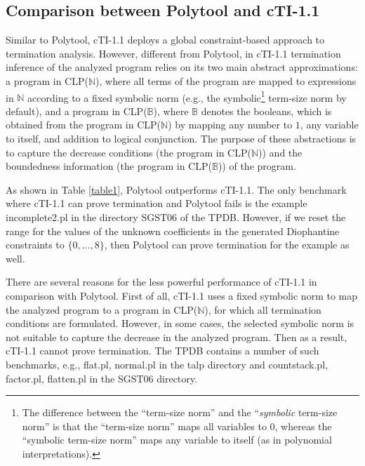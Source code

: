\documentclass[envcountsame]{tlp}
\newcounter{ex:der-lastsymconsctr}
\begin{document}
\subsection{Comparison between \textsf{Polytool} and \textsf{cTI-1.1}}
\label{polytool-cti}

Similar to \textsf{Polytool}, \textsf{cTI-1.1} deploys a global constraint-based approach to termination
analysis. However, different from \textsf{Polytool}, in \textsf{cTI-1.1} termination
inference of the analyzed program relies on its two main abstract
approximations: a program in \textsf{CLP($\mathbb{N}$)}, where all terms of
the program are mapped to expressions in $\mathbb{N}$ according to a fixed
symbolic norm (e.g., the symbolic\footnote{The difference between the
``term-size norm'' and the ``\emph{symbolic} term-size norm'' is that the
``term-size norm'' maps all variables to $0$, whereas the
``symbolic term-size norm'' maps any variable to itself (as in polynomial
interpretations).}
term-size norm by default), and a program in
\textsf{CLP($\mathbb{B}$)}, where $\mathbb{B}$ denotes the booleans, which is obtained from the
program in \textsf{CLP($\mathbb{N}$)} by mapping any number to
	$1$, any variable to itself, and addition to logical conjunction. The
		purpose of these abstractions is to capture the decrease conditions
		(the program in \textsf{CLP($\mathbb{N}$)}) and the boundedness information
			(the program in \textsf{CLP($\mathbb{B}$)}) of the program.

As shown in Table \ref{table1}, \textsf{Polytool} outperforms
\textsf{cTI-1.1}. The only benchmark where \textsf{cTI-1.1} can prove
termination and \textsf{Polytool} fails is the example
\textsf{incomplete2.pl} in the directory \textsf{SGST06} of the TPDB. 
However, if we reset the range for the values of the unknown coefficients in the
generated Diophantine constraints to $\{0,\ldots,8\}$, then \textsf{Polytool}
can prove termination for the example as well.

There are several reasons for the less powerful performance of \textsf{cTI-1.1}
in comparison with \textsf{Polytool}.  
First of all, \textsf{cTI-1.1} uses a fixed symbolic norm 
to map the analyzed program to a program in
\textsf{CLP($\mathbb{N}$)}, for which all termination conditions are
formulated. However, in some cases, the selected symbolic norm is not suitable
to capture the decrease in the analyzed program. Then as
a result, \textsf{cTI-1.1} cannot prove termination. The TPDB
contains a number of such benchmarks, e.g., \textsf{flat.pl},
\textsf{normal.pl} in the \textsf{talp} directory and
 \textsf{countstack.pl}, \textsf{factor.pl},
\textsf{flatten.pl} in the \textsf{SGST06} directory.
\end{document}

